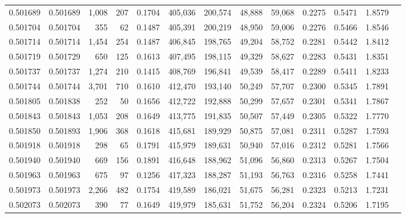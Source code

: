 \begin{tabular}{rrrrrrrrrrrrr}
0.501689 & 0.501689 & 1,008 &   207 &                                     0.1704 & 405,036 & 200,574 &  48,888 &  59,068 & 0.2275 & 0.5471 & 1.8579 \\
0.501704 & 0.501704 &   355 &    62 &                                     0.1487 & 405,391 & 200,219 &  48,950 &  59,006 & 0.2276 & 0.5466 & 1.8546 \\
0.501714 & 0.501714 & 1,454 &   254 &                                     0.1487 & 406,845 & 198,765 &  49,204 &  58,752 & 0.2281 & 0.5442 & 1.8412 \\
0.501719 & 0.501729 &   650 &   125 &                                     0.1613 & 407,495 & 198,115 &  49,329 &  58,627 & 0.2283 & 0.5431 & 1.8351 \\
0.501737 & 0.501737 & 1,274 &   210 &                                     0.1415 & 408,769 & 196,841 &  49,539 &  58,417 & 0.2289 & 0.5411 & 1.8233 \\
0.501744 & 0.501744 & 3,701 &   710 &                                     0.1610 & 412,470 & 193,140 &  50,249 &  57,707 & 0.2300 & 0.5345 & 1.7891 \\
0.501805 & 0.501838 &   252 &    50 &                                     0.1656 & 412,722 & 192,888 &  50,299 &  57,657 & 0.2301 & 0.5341 & 1.7867 \\
0.501843 & 0.501843 & 1,053 &   208 &                                     0.1649 & 413,775 & 191,835 &  50,507 &  57,449 & 0.2305 & 0.5322 & 1.7770 \\
0.501850 & 0.501893 & 1,906 &   368 &                                     0.1618 & 415,681 & 189,929 &  50,875 &  57,081 & 0.2311 & 0.5287 & 1.7593 \\
0.501918 & 0.501918 &   298 &    65 &                                     0.1791 & 415,979 & 189,631 &  50,940 &  57,016 & 0.2312 & 0.5281 & 1.7566 \\
0.501940 & 0.501940 &   669 &   156 &                                     0.1891 & 416,648 & 188,962 &  51,096 &  56,860 & 0.2313 & 0.5267 & 1.7504 \\
0.501963 & 0.501963 &   675 &    97 &                                     0.1256 & 417,323 & 188,287 &  51,193 &  56,763 & 0.2316 & 0.5258 & 1.7441 \\
0.501973 & 0.501973 & 2,266 &   482 &                                     0.1754 & 419,589 & 186,021 &  51,675 &  56,281 & 0.2323 & 0.5213 & 1.7231 \\
0.502073 & 0.502073 &   390 &    77 &                                     0.1649 & 419,979 & 185,631 &  51,752 &  56,204 & 0.2324 & 0.5206 & 1.7195 \\

\end{tabular}
